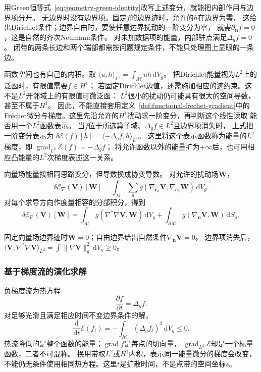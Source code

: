 用Green恒等式~\eqref{eq:geometry-green-identity}改写上述变分，就能把内部作用与边界项分开。
无边界时没有边界项。固定$f$的边界迹时，允许的$h$在边界为零，
这给出Dirichlet条件；边界自由时，要使任意边界扰动的一阶变分为零，
就需$\partial_{\bm n}f=0$，这是自然的齐次Neumann条件。
对未加数据项的能量，内部驻点满足$\Delta_gf=0$。
闭带的两条长边和两个端部都需按问题规定条件，不能只处理图上显眼的一条边。

函数空间也有自己的内积。取
$\langle u,h\rangle_{L^2}=\int_{\mathcal M}uh\,\mathrm dV_g$。
把Dirichlet能量视为$L^2$上的泛函时，有限值需要$f\in H^1$；
若固定Dirichlet边值，还需施加相应的迹约束。这不是$L^2$开邻域上的有限值可微泛函：
$L^2$很小的扰动仍可能具有很大的空间导数，甚至不属于$H^1$。
因此，不能直接套用定义~\ref{def:functional-frechet-gradient}中的
Fréchet微分与梯度。这里先沿允许的$H^1$扰动求一阶变分，再判断这个线性读取
能否用一个$L^2$函数表示。
当$f$位于所选算子域、$\Delta_gf\in L^2$且边界项消失时，
上式把一阶变分表示为
$\delta\mathcal E(f)[h]=\langle-\Delta_gf,h\rangle_{L^2}$。
这里将这个表示函数称为能量的$L^2$梯度，即
$\operatorname{grad}_{L^2}\mathcal E(f)=-\Delta_gf$；
将允许函数以外的能量扩为$+\infty$后，也可用相应凸能量的$L^2$次梯度表述这一关系。


向量场能量按相同思路变分，但导数换成协变导数。
对允许的扰动场$\bm W$，
\[
 \delta\mathcal E_\nabla(\bm V)[\bm W]
 =\int_{\mathcal M}\sum_a
     g(\nabla_{\bm e_a}\bm V,\nabla_{\bm e_a}\bm W)\,\mathrm dV_g.
\]
对每个求导方向作度量相容的分部积分，得到
\begin{equation}
 \delta\mathcal E_\nabla(\bm V)[\bm W]
 =\int_{\mathcal M}g(\nabla^*\nabla\bm V,\bm W)\,\mathrm dV_g
  +\int_{\partial\mathcal M}g(\nabla_{\bm n}\bm V,\bm W)\,\mathrm dS_g,
 \label{eq:geometry-connection-laplacian-variation}
\end{equation}


固定向量场边界迹时$\bm W=0$；自由边界给出自然条件$\nabla_{\bm n}\bm V=0$。
边界项消失后，
$\langle\bm V,\nabla^*\nabla\bm V\rangle_{L^2}
=\int\lVert\nabla\bm V\rVert_g^2\,\mathrm dV_g\geq0$。

\subsubsection{基于梯度流的演化求解}
\label{sec:functional-gradient-flow-solvers}

负梯度流为热方程
\begin{equation}
 \frac{\partial f}{\partial t}=\Delta_gf.
 \label{eq:geometry-heat-equation}
\end{equation}
对足够光滑且满足相应时间不变边界条件的解，
\[
 \frac{\mathrm d}{\mathrm dt}\mathcal E(f_t)
 =-\int_{\mathcal M}(\Delta_gf_t)^2\,\mathrm dV_g\leq0.
\]
热流降低的是整个函数的能量；$\operatorname{grad}f$是每点的切向量，
$\operatorname{grad}_{L^2}\mathcal E$却是一个标量函数，二者不可混称。
换用带权$L^2$或$H^1$内积，表示同一能量微分的梯度会改变，
不能仍无条件使用相同热方程。这里$t$是扩散时间，不是点带的空间坐标$s$。


